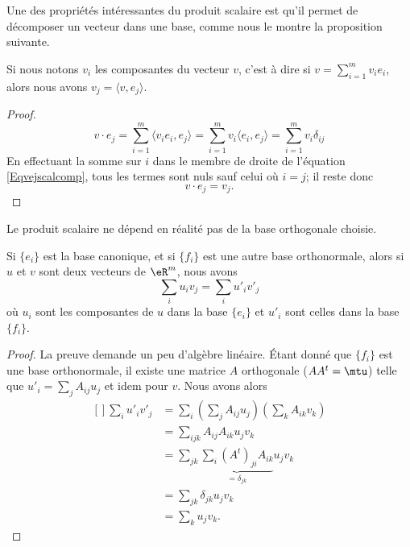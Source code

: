 Une des propriétés intéressantes du produit scalaire est qu'il permet de décomposer un vecteur dans une base, comme nous le montre la proposition suivante.

\begin{proposition}		\label{PropScalCompDec}
	Si nous notons $v_i$ les composantes du vecteur $v$, c'est à dire si $v=\sum_{i=1}^m v_ie_i$, alors nous avons $v_j=\langle v, e_j\rangle $.
\end{proposition}

\begin{proof}
	\begin{equation}		\label{Eqvejscalcomp}
		v\cdot e_j=\sum_{i=1}^m\langle v_ie_i, e_j\rangle =\sum_{i=1}^mv_i\langle e_i, e_j\rangle =\sum_{i=1}^mv_i\delta_{ij}
	\end{equation}
	En effectuant la somme sur $i$ dans le membre de droite de l'équation \eqref{Eqvejscalcomp}, tous les termes sont nuls sauf celui où $i=j$; il reste donc
	\begin{equation}
		v\cdot e_j=v_j.
	\end{equation}
\end{proof}

Le produit scalaire ne dépend en réalité pas de la base orthogonale choisie. 

\begin{lemma}
	Si $\{ e_i \}$ est la base canonique, et si $\{ f_i \}$ est une autre base orthonormale, alors si $u$ et $v$ sont deux vecteurs de $\eR^m$, nous avons
	\begin{equation}
		\sum_i u_iv_j=\sum_iu'_iv'_j
	\end{equation}
	où $u_i$ sont les composantes de $u$ dans la base $\{ e_i \}$ et $u'_i$ sont celles dans la base $\{ f_i \}$.
\end{lemma}

\begin{proof}
	La preuve demande un peu d'algèbre linéaire. Étant donné que $\{ f_i \}$ est une base orthonormale, il existe une matrice $A$ orthogonale ($AA^t=\mtu$) telle que $u'_i=\sum_jA_{ij}u_j$ et idem pour $v$. Nous avons alors
	\begin{equation}
		\begin{aligned}[]
			\sum_iu'_iv'_j&=\sum_i\left( \sum_jA_{ij} u_j\right)\left( \sum_k A_{ik}v_k \right)\\
			&=\sum_{ijk}A_{ij}A_{ik}u_jv_k\\
			&=\sum_{jk}\underbrace{\sum_i(A^t)_{ji}A_{ik}}_{=\delta_{jk}}u_jv_k\\
			&=\sum_{jk}\delta_{jk}u_jv_k\\
			&=\sum_ku_jv_k.
		\end{aligned}
	\end{equation}	
\end{proof}


